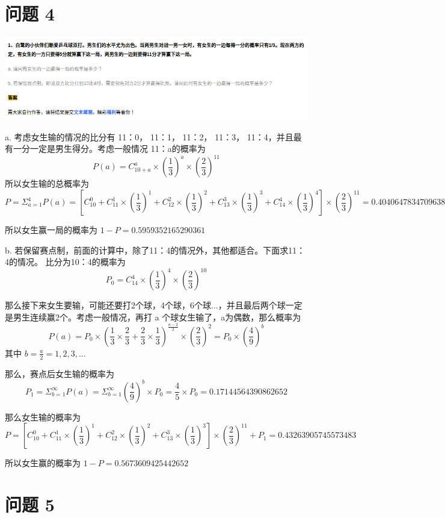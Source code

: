 \documentclass{article}
\begin{document}
\newpage
\section{问题 4}
\includegraphics[scale=0.5]{pingpang.png}

a. 考虑女生输的情况的比分有 11：0， 11：1， 11：2， 11：3， 11：4，并且最有一分一定是男生得分。考虑一般情况 11：a的概率为
$$
P(a) = C^a_{10+a} \times (\frac{1}{3})^a \times (\frac{2}{3})^{11}
$$
所以女生输的总概率为
$$
P = \Sigma_{a=1}^{4} P(a) = [C^0_{10} + C^1_{11} \times (\frac{1}{3})^1 + C^2_{12} \times (\frac{1}{3})^2 + C^3_{13} \times (\frac{1}{3})^3 + C^4_{14} \times (\frac{1}{3})^4] \times (\frac{2}{3})^{11} = 0.4040647834709638
$$

所以女生赢一局的概率为 $ 1 - P = 0.5959352165290361 $

\vspace{60pt}

b. 若保留赛点制，前面的计算中，除了11：4的情况外，其他都适合。下面求11：4的情况。
比分为10：4的概率为
$$
P_0 = C^4_{14} \times (\frac{1}{3})^4 \times (\frac{2}{3})^{10}
$$

那么接下来女生要输，可能还要打2个球，4个球，6个球...，并且最后两个球一定是男生连续赢2个。考虑一般情况，再打 a 个球女生输了，a为偶数，那么概率为
$$
P(a) = P_0 \times (\frac{1}{3} \times \frac{2}{3} + \frac{2}{3} \times \frac{1}{3})^{\frac{a-2}{2}} \times (\frac{2}{3})^2 = P_0 \times (\frac{4}{9})^b
$$
其中 $b=\frac{a}{2} = 1,2,3,...$

那么，赛点后女生输的概率为
$$
P_1 = \Sigma^{\infty}_{b=1} P(a) = \Sigma^{\infty}_{b=1}(\frac{4}{9})^b \times P_0 = \frac{4}{5} \times P_0 = 0.17144564390862652
$$

那么女生输的概率为
$$
P = [C^0_{10} + C^1_{11} \times (\frac{1}{3})^1 + C^2_{12} \times (\frac{1}{3})^2 + C^3_{13} \times (\frac{1}{3})^3] \times (\frac{2}{3})^{11} + P_1 = 0.43263905745573483
$$

所以女生赢的概率为 $ 1 - P = 0.5673609425442652 $

\newpage

\section{问题 5}
\end{document}
